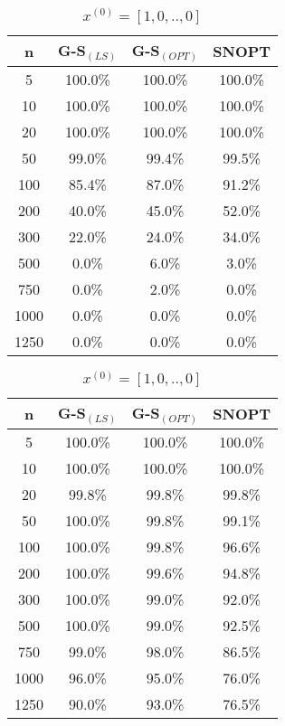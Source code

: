 \begin{table}
\begin{minipage}{.4\linewidth}
\centering
\begin{tabular}{ c | c | c | c }
n &  G-S$_{(LS)}$ & G-S$_{(OPT)}$  & SNOPT \\\hline
5    & 100.0\% & 100.0\% & 100.0\%\\\hline
10   & 100.0\% & 100.0\% & 100.0\%\\\hline
20   & 100.0\% & 100.0\% & 100.0\%\\\hline
50   & 99.0\%  & 99.4\%  & 99.5\%\\\hline
100  & 85.4\%  & 87.0\%  & 91.2\%\\\hline
200  & 40.0\%  & 45.0\%  & 52.0\%\\\hline
300  & 22.0\%  & 24.0\%  & 34.0\%\\\hline
500  & 0.0\%   & 6.0\%   & 3.0\%\\\hline
750  & 0.0\%   & 2.0\%   & 0.0\%\\\hline
1000 & 0.0\%   & 0.0\%   & 0.0\%\\\hline
1250 & 0.0\%   & 0.0\%   & 0.0\%\\\hline
\end{tabular}
\caption{$x^{(0)}_i = 1/n \quad \forall i$}
\end{minipage}
\hfill
\begin{minipage}{.4\linewidth}
\centering
\begin{tabular}{ c | c| c | c}
n &  G-S$_{(LS)}$ & G-S$_{(OPT)}$  & SNOPT \\\hline
5    & 100.0\%  & 100.0\% & 100.0\%\\\hline
10   & 100.0\%  & 100.0\% & 100.0\%\\\hline
20   & 99.8\%   & 99.8\%  & 99.8\%\\\hline
50   & 100.0\%  & 99.8\%  & 99.1\%\\\hline
100  & 100.0\%  & 99.8\%  & 96.6\% \\\hline
200  & 100.0\%  & 99.6\%  & 94.8\% \\\hline
300  & 100.0\%  & 99.0\%  & 92.0\% \\\hline
500  & 100.0\%  & 99.0\%  & 92.5\%\\\hline
750  & 99.0\%   & 98.0\%  & 86.5\%\\\hline
1000 & 96.0\%   & 95.0\%  & 76.0\%\\\hline
1250 & 90.0\%   & 93.0\%  & 76.5\%\\\hline
\end{tabular}
\caption{$x^{(0)}= [1, 0, .., 0]$}
\end{minipage}
\end{table}


